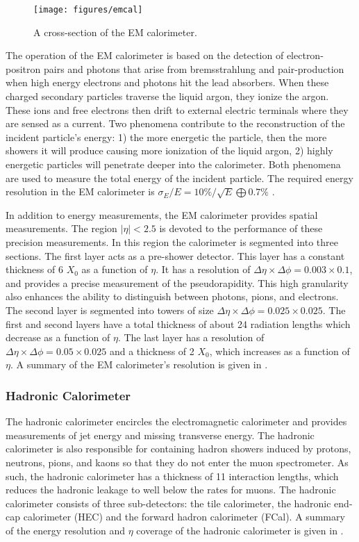 \begin{figure}[!hbpt]
  \centering
  \texttt{[image: figures/emcal]}
  \caption{A cross-section of the EM calorimeter.}
  \label{fig:emcal}
\end{figure}

The operation of the EM calorimeter is based on the detection of electron-positron
pairs and photons that arise from bremsstrahlung and pair-production when high
energy electrons and photons hit the lead absorbers. When these charged
secondary particles traverse the liquid argon, they ionize the argon.
These ions and free electrons then drift to external electric terminals where
they are sensed as a current. Two phenomena contribute to the reconstruction
of the incident particle's energy: 1) the more energetic the particle, then
the more showers it will produce causing more ionization of the liquid argon,
2) highly energetic particles will penetrate deeper into the calorimeter.
Both phenomena are used to measure the total energy of the incident particle.
The required energy resolution in the EM calorimeter is 
$\sigma_E/E = 10\% / \sqrt{E} \bigoplus 0.7\%$ \cite{Lardesign}.

In addition to energy measurements, the EM calorimeter provides spatial
measurements. The region $|\eta| < 2.5$ is devoted to the 
performance of these precision measurements.
In this region the calorimeter is segmented into three sections. The first
layer acts as a pre-shower detector. This layer has a constant thickness of
6 $X_0$ as a function of $\eta$. It has a resolution of $\Delta\eta \times
\Delta\phi = 0.003 \times 0.1$, and provides a precise measurement of
the pseudorapidity. This high granularity also enhances the ability to distinguish
between photons, pions, and electrons. The second layer is segmented into towers
of size $\Delta \eta \times \Delta\phi = 0.025 \times 0.025$. The first
and second layers have a total thickness of about 24 radiation lengths which
decrease as a function of $\eta$. The last layer has a resolution of 
$\Delta\eta \times \Delta\phi = 0.05 \times 0.025$ and a thickness of
2 $X_0$, which increases as a function of $\eta$. A summary of the EM 
calorimeter's resolution is given in .

\subsubsection*{Hadronic Calorimeter}
The hadronic calorimeter encircles the electromagnetic calorimeter and
provides measurements of jet energy and missing transverse energy. The hadronic
calorimeter is also responsible for containing hadron showers induced by
protons, neutrons, pions, and kaons so that they do not enter the muon spectrometer.
As such, the hadronic calorimeter has a thickness of 11 interaction
lengths, which reduces the hadronic leakage to well below the rates for muons.
The hadronic calorimeter consists of three sub-detectors: the tile 
calorimeter, the hadronic end-cap calorimeter (HEC) and the forward hadron
calorimeter (FCal). A summary of the energy resolution and $\eta$ coverage
of the hadronic calorimeter is given in .

